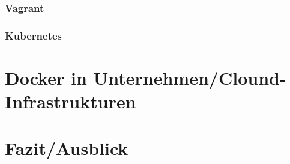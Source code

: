 \documentclass[11pt,a4paper,oneside]{report}
\newcommand{\bibtexFilename}{draft} %
\begin{document}
		\subsection{Vagrant}
		\subsection{Kubernetes}
\chapter{Docker in Unternehmen/Clound-Infrastrukturen}


\chapter{Fazit/Ausblick}



\appendix


\end{document}
